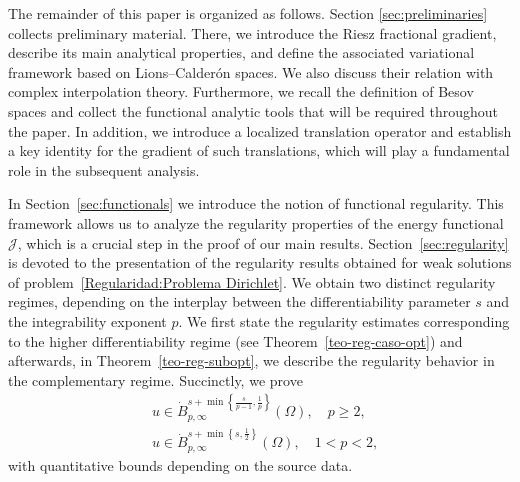 \documentclass[]{amsart}
\theoremstyle{definition}
\theoremstyle{definition}
\theoremstyle{remark}
\numberwithin{equation}{section}
\begin{document}

    
The remainder of this paper is organized as follows. Section \ref{sec:preliminaries} collects preliminary material. There, we introduce the Riesz fractional gradient, describe its main analytical properties, and define the associated variational framework based on Lions--Calderón spaces. We also discuss their relation with complex interpolation theory. Furthermore, we recall the definition of Besov spaces and collect the functional analytic tools that will be required throughout the paper. In addition, we introduce a localized translation operator and establish a key identity for the gradient of such translations, which will play a fundamental role in the subsequent analysis.

In Section~\ref{sec:functionals} we introduce the notion of functional regularity.
This framework allows us to analyze the regularity properties of the energy functional \(\mathcal{J}\), which is a crucial step in the proof of our main results. Section~\ref{sec:regularity} is devoted to the presentation of the regularity results obtained for weak solutions of problem~\eqref{Regularidad:Problema Dirichlet}. We obtain
two distinct regularity regimes, depending on the interplay between the differentiability parameter \(s\) and the integrability exponent \(p\).
%
We first state the regularity estimates corresponding to the higher differentiability regime (see Theorem~\ref{teo-reg-caso-opt}) and afterwards, in Theorem~\ref{teo-reg-subopt}, we describe the regularity behavior in the complementary regime. Succinctly, we prove 
\[ \begin{split}
&u \in \dot{B}_{p,\infty}^{s+\min\left\{\frac{s}{p-1},\frac1p\right\}}(\Omega),  \quad p \ge 2, \\
&u \in \dot{B}_{p,\infty}^{s+\min\left\{s,\frac12\right\}}(\Omega),  \quad 1< p < 2,
\end{split} \]
 with quantitative bounds depending on the source data.

\end{document}
